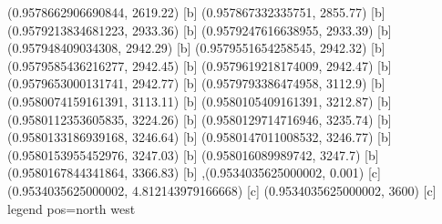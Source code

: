 {{{(0.9578662906690844, 2619.22) [b] 
(0.957867332335751, 2855.77) [b] 
(0.9579213834681223, 2933.36) [b] 
(0.9579247616638955, 2933.39) [b] 
(0.957948409034308, 2942.29) [b] 
(0.9579551654258545, 2942.32) [b] 
(0.9579585436216277, 2942.45) [b] 
(0.9579619218174009, 2942.47) [b] 
(0.9579653000131741, 2942.77) [b] 
(0.9579793386474958, 3112.9) [b] 
(0.9580074159161391, 3113.11) [b] 
(0.9580105409161391, 3212.87) [b] 
(0.9580112353605835, 3224.26) [b] 
(0.9580129714716946, 3235.74) [b] 
(0.9580133186939168, 3246.64) [b] 
(0.9580147011008532, 3246.77) [b] 
(0.9580153955452976, 3247.03) [b] 
(0.958016089989742, 3247.7) [b] 
(0.9580167844341864, 3366.83) [b] 
},{(0.9534035625000002, 0.001) [c] 
(0.9534035625000002, 4.812143979166668) [c] 
(0.9534035625000002, 3600) [c] 
}}}{legend pos=north west}